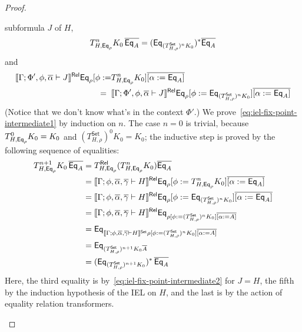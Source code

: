 \documentclass[runningheads]{llncs}
\newcommand{\set}{\mathsf{Set}}
\begin{document}
\begin{proof}
\begin{itemize}
subformula $J$ of $H$,
\begin{equation}\label{eq:iel-fix-point-intermediate1}
T^n_{H, \Eq_{\rho}} K_0\, \ol{\Eq_A} = (\Eq_{(T^\set_{H, \rho})^n K_0})^*
\ol{\Eq_A}
\end{equation}
and 
\begin{equation}\label{eq:iel-fix-point-intermediate2}
\begin{split}
  \relsem{\Gamma; \Phi', \phi, \ol{\alpha} \vdash J}
\Eq_{\rho} [\phi := 
 & T^{n}_{H,\Eq_{\rho}} K_0] \overline{[\alpha :=
    \Eq_A]} \\
=\;\; & \relsem{\Gamma; \Phi', \phi, \ol{\alpha} \vdash J} \Eq_{\rho} [\phi
  := \Eq_{(T^\set_{H,\rho})^n K_0}] \overline{[\alpha :=
    \Eq_A]}
\end{split}
\end{equation}
(Notice that we don't know what's in the context $\Phi'$.)
We prove~\eqref{eq:iel-fix-point-intermediate1} by induction on $n$.
The case $n=0$ is trivial, because $T^0_{H,\mathsf{Eq}_{\rho}} K_0 = K_0$ and
$(T^\set_{H,\rho})^0 K_0 = K_0$; the inductive step is proved by the
following sequence of equalities:
\[
\begin{split}
T^{n+1}_{H,\Eq_{\rho}} K_0\, \overline{\Eq_A}
&= T^\rel_{H,\Eq_{\rho}} (T^{n}_{H,\Eq_{\rho}} K_0)
\overline{\Eq_A} \\ 
&= \relsem{\Gamma; \phi, \ol{\alpha}, \ol\gamma \vdash H} \Eq_{\rho} [\phi
  := T^{n}_{H, \Eq_{\rho}} K_0] \overline{[\alpha :=
    \Eq_A]} \\ 
&= \relsem{\Gamma; \phi, \ol{\alpha}, \ol\gamma \vdash H} \Eq_{\rho} [\phi
  := \Eq_{(T^\set_{H,\rho})^n K_0}] \overline{[\alpha :=
    \Eq_A]} \\ 
&= \relsem{\Gamma; \phi, \ol{\alpha}, \ol\gamma \vdash H} \Eq_{\rho [\phi
    := (T^\set_{H,\rho})^n K_0] \overline{[\alpha :=
      A]}} \\ 
&= \Eq_{\setsem{\Gamma; \phi, \ol{\alpha}, \ol\gamma \vdash H} \rho [\phi
    := (T^\set_{H,\rho})^n K_0] \overline{[\alpha :=
      A]}} \\ 
&= \Eq_{(T^\set_{H,\rho})^{n+1} K_0 \overline{A}} \\ 
&= (\Eq_{(T^\set_{H,\rho})^{n+1} K_0})^*\, \overline{\Eq_A} 
\end{split}
\]
Here, the third equality is by~\eqref{eq:iel-fix-point-intermediate2}
for $J = H$, the fifth by the induction hypothesis of the IEL on $H$,
and the last is by the action of equality relation transformers.

\vspace*{0.1in}


\end{itemize}
\end{proof}
\end{document}
